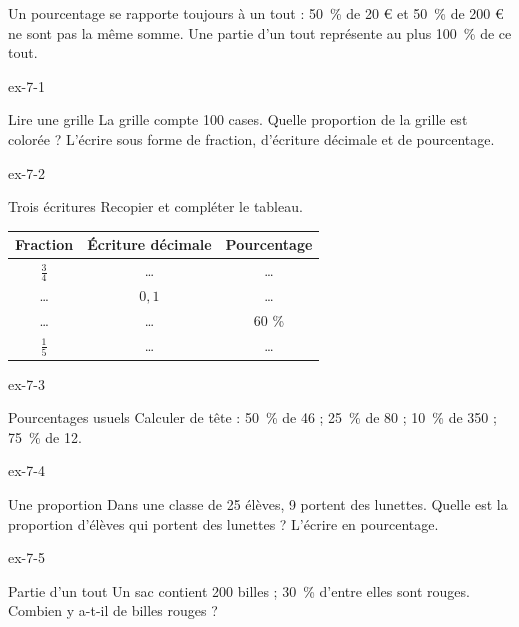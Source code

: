 \begin{attention}Un pourcentage se rapporte toujours à un tout : 50~\% de 20 € et 50~\% de 200 € ne sont pas la même somme. Une partie d’un tout représente au plus 100~\% de ce tout.\end{attention}

\clearpage{}
\begin{blocLivre}{ex-7-1}\begin{exercice}[1]{Lire une grille}
La grille compte 100 cases. Quelle proportion de la grille est colorée ? L’écrire sous forme de fraction, d’écriture décimale et de pourcentage.
\label{fig-ex-7-1}
\end{exercice}\end{blocLivre}
\begin{blocLivre}{ex-7-2}\begin{exercice}[1]{Trois écritures}
Recopier et compléter le tableau.\begin{center}\renewcommand{\arraystretch}{1.35}\begin{tabular}{c|cc}\toprule
Fraction & Écriture décimale & Pourcentage\\\midrule
$\frac34$ & … & …\\
… & $0{,}1$ & …\\
… & … & 60 \%\\
$\frac15$ & … & …\\
\bottomrule\end{tabular}\end{center}
\end{exercice}\end{blocLivre}
\begin{blocLivre}{ex-7-3}\begin{exercice}[1]{Pourcentages usuels}
Calculer de tête : 50~\% de 46 ; 25~\% de 80 ; 10~\% de 350 ; 75~\% de 12.
\end{exercice}\end{blocLivre}
\begin{blocLivre}{ex-7-4}\begin{exercice}[1]{Une proportion}
Dans une classe de 25 élèves, 9 portent des lunettes. Quelle est la proportion d’élèves qui portent des lunettes ? L’écrire en pourcentage.
\end{exercice}\end{blocLivre}
\begin{blocLivre}{ex-7-5}\begin{exercice}[1]{Partie d’un tout}
Un sac contient 200 billes ; 30~\% d’entre elles sont rouges. Combien y a-t-il de billes rouges ?
\end{exercice}\end{blocLivre}

